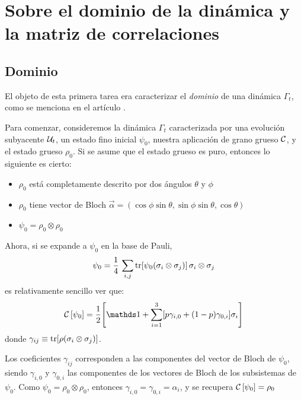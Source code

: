 \section{Sobre el dominio de la dinámica y la matriz de correlaciones}

\subsection{Dominio}

El objeto de esta primera tarea era caracterizar el \textit{dominio} de una dinámica $\Gamma_{t}$, como se menciona en el artículo \cite{CGEmergingDynamics}.

Para comenzar, consideremos la dinámica  $\Gamma_{t}$ caracterizada por una evolución subyacente $\mathcal{U}_{
t}$, un estado fino inicial $\psi_{0}$, nuestra aplicación de grano grueso $\mathcal{C}$, y el estado grueso $\rho_{0}$. Si se asume que el estado grueso es puro, entonces lo siguiente es cierto:
\begin{itemize}
\item $\rho_{0}$ está completamente descrito por dos ángulos $\theta$ y $\phi$
\item $\rho_{0}$ tiene vector de Bloch $\vec{\alpha}=(\cos{\phi}\sin{\theta},\sin{\phi}\sin{\theta},\cos{\theta})$
\item $\psi_{0}=\rho_{0}\otimes\rho_{0}$
\end{itemize}
Ahora, si se expande a $\psi_{0}$ en la base de Pauli,
\begin{equation}
    \psi_{0} = \frac{1}{4}\,\sum_{i,j} \tr[\psi_{0}(\sigma_i \otimes \sigma_j)]\, \sigma_i\otimes\sigma_j
\end{equation}
es relativamente sencillo ver que:
\begin{equation}
    \CG{\psi_{0}} = \frac{1}{2}\qty[\Id + \sum_{i=1}^3[p\gamma_{i,0}+(1-p)\gamma_{0,i}]\sigma_i]
\end{equation}
donde $\gamma_{ij} \equiv \tr[\rho(\sigma_i \otimes\sigma_j)]$. 

Los coeficientes $\gamma_{ij}$ corresponden a las componentes del vector de Bloch de $\psi_{0}$, siendo $\gamma_{i,0}$ y $\gamma_{0,i}$ las componentes de los vectores de Bloch de los subsistemas de $\psi_{0}$. Como $\psi_{0}=\rho_{0}\otimes\rho_{0}$, entonces $\gamma_{i,0}=\gamma_{0,i}=\alpha_{i}$, y se recupera $\mathcal{C}\left[\psi_{0}\right]=\rho_{0}$

